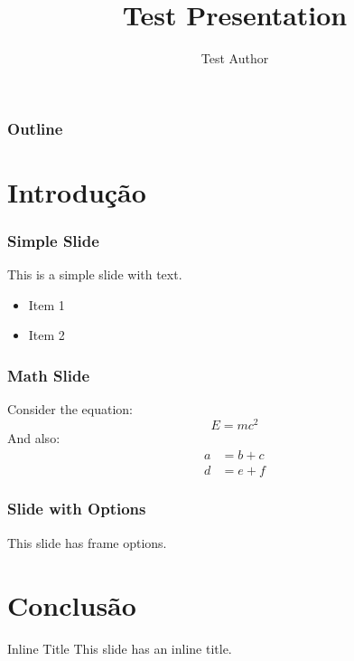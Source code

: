 \documentclass{beamer}
\title{Test Presentation}
\author{Test Author}
\begin{document}
\begin{frame}
\titlepage
\end{frame}

\begin{frame}
\frametitle{Outline}
\tableofcontents
\end{frame}

\section{Introdução}

\begin{frame}
\frametitle{Simple Slide}
This is a simple slide with text.
\begin{itemize}
\item Item 1
\item Item 2
\end{itemize}
\end{frame}

\begin{frame}
\frametitle{Math Slide}
Consider the equation:
$$E = mc^2$$
And also:
\begin{align}
a &= b + c \\
d &= e + f
\end{align}
\end{frame}

\begin{frame}[fragile]
\frametitle{Slide with Options}
This slide has frame options.
\end{frame}

\section{Conclusão}

\begin{frame}{Inline Title}
This slide has an inline title.
\end{frame}
\end{document}
